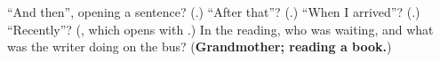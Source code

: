 \begin{tcolorbox}[breakable,colback=teal!4,colframe=teal!35!black,title={Before you move on}]
\textquotedblleft{}And then\textquotedblright{}, opening a sentence? (\textbf{}.) \textquotedblleft{}After that\textquotedblright{}? (\textbf{}.) \textquotedblleft{}When I arrived\textquotedblright{}? (\textbf{}.) \textquotedblleft{}Recently\textquotedblright{}? (\textbf{}, which opens with \textbf{}.) In the reading, who was waiting, and what was the writer doing on the bus? (\textbf{Grandmother; reading a book.})
\end{tcolorbox}
